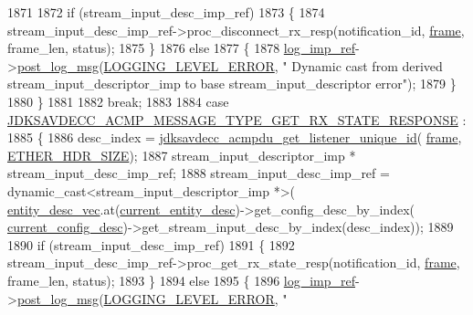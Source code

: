 \begin{DoxyCode}
1871 
1872         \textcolor{keywordflow}{if} (stream\_input\_desc\_imp\_ref)
1873         \{
1874             stream\_input\_desc\_imp\_ref->proc\_disconnect\_rx\_resp(notification\_id, 
      \hyperlink{gst__avb__playbin_8c_ac8e710e0b5e994c0545d75d69868c6f0}{frame}, frame\_len, status);
1875         \}
1876         \textcolor{keywordflow}{else}
1877         \{
1878             \hyperlink{namespaceavdecc__lib_acbe3e2a96ae6524943ca532c87a28529}{log\_imp\_ref}->\hyperlink{classavdecc__lib_1_1log_a68139a6297697e4ccebf36ccfd02e44a}{post\_log\_msg}(\hyperlink{namespaceavdecc__lib_a501055c431e6872ef46f252ad13f85cdaf2c4481208273451a6f5c7bb9770ec8a}{LOGGING\_LEVEL\_ERROR}, \textcolor{stringliteral}{"
      Dynamic cast from derived stream\_input\_descriptor\_imp to base stream\_input\_descriptor error"});
1879         \}
1880     \}
1881 
1882     \textcolor{keywordflow}{break};
1883 
1884     \textcolor{keywordflow}{case} \hyperlink{group__acmp__message__type_ga30ae864d402e25fc3f458f742507ff26}{JDKSAVDECC\_ACMP\_MESSAGE\_TYPE\_GET\_RX\_STATE\_RESPONSE}
      :
1885     \{
1886         desc\_index = \hyperlink{group__acmpdu_ga36867bfc130619cbea38caa3ce54bc89}{jdksavdecc\_acmpdu\_get\_listener\_unique\_id}(
      \hyperlink{gst__avb__playbin_8c_ac8e710e0b5e994c0545d75d69868c6f0}{frame}, \hyperlink{namespaceavdecc__lib_a6c827b1a0d973e18119c5e3da518e65ca9512ad9b34302ba7048d88197e0a2dc0}{ETHER\_HDR\_SIZE});
1887         stream\_input\_descriptor\_imp * stream\_input\_desc\_imp\_ref;
1888         stream\_input\_desc\_imp\_ref = \textcolor{keyword}{dynamic\_cast<}stream\_input\_descriptor\_imp *\textcolor{keyword}{>}(
      \hyperlink{classavdecc__lib_1_1end__station__imp_a72edab41bc56e3c1757944a7df188a3d}{entity\_desc\_vec}.at(\hyperlink{classavdecc__lib_1_1end__station__imp_afd78c89df26ba7641e1adb764c0e827d}{current\_entity\_desc})->get\_config\_desc\_by\_index(
      \hyperlink{classavdecc__lib_1_1end__station__imp_a60b1af40d35e8a86b0082c54ab6cb6a8}{current\_config\_desc})->get\_stream\_input\_desc\_by\_index(desc\_index));
1889 
1890         \textcolor{keywordflow}{if} (stream\_input\_desc\_imp\_ref)
1891         \{
1892             stream\_input\_desc\_imp\_ref->proc\_get\_rx\_state\_resp(notification\_id, 
      \hyperlink{gst__avb__playbin_8c_ac8e710e0b5e994c0545d75d69868c6f0}{frame}, frame\_len, status);
1893         \}
1894         \textcolor{keywordflow}{else}
1895         \{
1896             \hyperlink{namespaceavdecc__lib_acbe3e2a96ae6524943ca532c87a28529}{log\_imp\_ref}->\hyperlink{classavdecc__lib_1_1log_a68139a6297697e4ccebf36ccfd02e44a}{post\_log\_msg}(\hyperlink{namespaceavdecc__lib_a501055c431e6872ef46f252ad13f85cdaf2c4481208273451a6f5c7bb9770ec8a}{LOGGING\_LEVEL\_ERROR}, \textcolor{stringliteral}{"
}
\end{DoxyCode}

